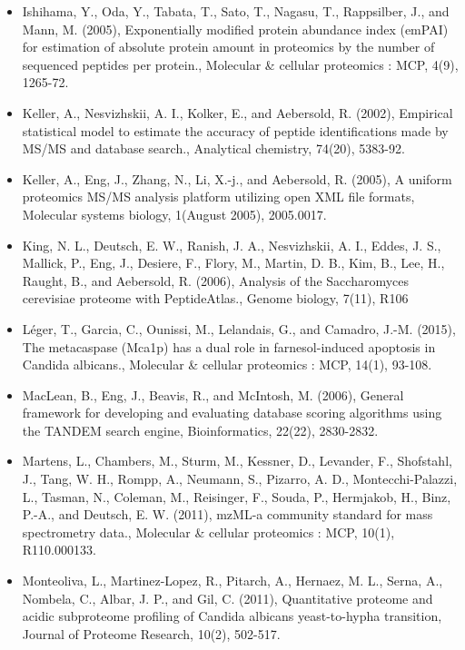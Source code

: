 \begin{itemize}
\item[]{%
Ishihama, Y., Oda, Y., Tabata, T., Sato, T., Nagasu, T., Rappsilber, J., and Mann, M. (2005),
Exponentially modified protein abundance index (emPAI) for estimation of absolute protein
amount in proteomics by the number of sequenced peptides per protein., 
Molecular \& cellular proteomics : MCP, 4(9), 1265-72.
}

\item[]{%
Keller, A., Nesvizhskii, A. I., Kolker, E., and Aebersold, R. (2002), Empirical statistical model
to estimate the accuracy of peptide identifications made by MS/MS and database search.,
Analytical chemistry, 74(20), 5383-92.
}

\item[]{%
Keller, A., Eng, J., Zhang, N., Li, X.-j., and Aebersold, R. (2005), A uniform proteomics MS/MS
analysis platform utilizing open XML file formats, Molecular systems biology, 1(August
2005), 2005.0017.
}

\item[]{%
King, N. L., Deutsch, E. W., Ranish, J. A., Nesvizhskii, A. I., Eddes, J. S., Mallick, P., Eng, J.,
Desiere, F., Flory, M., Martin, D. B., Kim, B., Lee, H., Raught, B., and Aebersold, R. (2006),
Analysis of the Saccharomyces cerevisiae proteome with PeptideAtlas., Genome biology,
7(11), R106
}

\item[]{%
L\'eger, T., Garcia, C., Ounissi, M., Lelandais, G., and Camadro, J.-M. (2015), 
The metacaspase (Mca1p) has a dual role in farnesol-induced apoptosis in Candida albicans.,
Molecular \& cellular proteomics : MCP, 14(1), 93-108.}


\item[]{%
MacLean, B., Eng, J., Beavis, R., and McIntosh, M. (2006), General framework for developing
and evaluating database scoring algorithms using the TANDEM search engine, 
Bioinformatics, 22(22), 2830-2832.
}

\item[]{%
Martens, L., Chambers, M., Sturm, M., Kessner, D., Levander, F., Shofstahl, J., Tang, W. H.,
Rompp, A., Neumann, S., Pizarro, A. D., Montecchi-Palazzi, L., Tasman, N., Coleman, M.,
Reisinger, F., Souda, P., Hermjakob, H., Binz, P.-A., and Deutsch, E. W. (2011), mzML-a
community standard for mass spectrometry data., Molecular \& cellular proteomics : MCP,
10(1), R110.000133.
}

\item[]{%
Monteoliva, L., Martinez-Lopez, R., Pitarch, A., Hernaez, M. L., Serna, A., Nombela, C., Albar,
J. P., and Gil, C. (2011), Quantitative proteome and acidic subproteome profiling of Candida
albicans yeast-to-hypha transition, Journal of Proteome Research, 10(2), 502-517.
}


\end{itemize}

